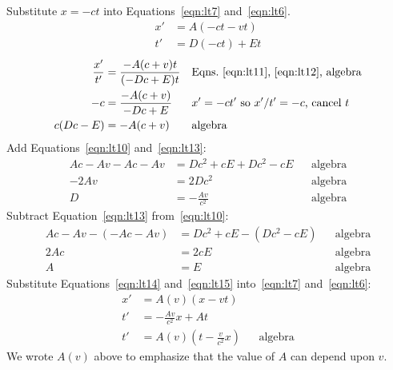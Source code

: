 \documentclass[a4paper]{article}
\theoremstyle{plain}
\theoremstyle{definition}
\begin{document}
Substitute $x = -ct$ into Equations~\eqref{eqn:lt7} and~\eqref{eqn:lt6}.
\begin{align}
x' & = A (-ct - vt) \label{eqn:lt11} \\
t' & = D(-ct) + Et \label{eqn:lt12}
\end{align}
\begin{align}
\frac{x'}{t'} & = \frac{-A (c + v)t}{(-Dc+E)t} & & \text{Eqns.~\eqref{eqn:lt11},~\eqref{eqn:lt12}, algebra} \nonumber \\
-c & = \frac{-A(c+v)}{-Dc+E} & & \text{$x'=-ct'$ so $x'/t'=-c$, cancel $t$} \nonumber \\
c(Dc-E) & = -A(c+v) & & \text{algebra} \label{eqn:lt13}
\end{align}
Add Equations~\eqref{eqn:lt10} and~\eqref{eqn:lt13}:
\begin{align}
Ac - Av - Ac - Av & = Dc^2 + cE + Dc^2 - cE & & \text{algebra} \nonumber \\
-2Av & = 2Dc^2 & & \text{algebra} \nonumber \\
D & = -\frac{Av}{c^2} & & \text{algebra} \label{eqn:lt14}
\end{align}
Subtract Equation~\eqref{eqn:lt13} from~\eqref{eqn:lt10}:
\begin{align}
Ac - Av - (-Ac - Av) & = Dc^2 + cE - (Dc^2 - cE) & & \text{algebra} \nonumber \\
2Ac & = 2cE & & \text{algebra} \nonumber \\
A & = E & & \text{algebra} \label{eqn:lt15}
\end{align}
Substitute Equations~\eqref{eqn:lt14} and~\eqref{eqn:lt15}
into~\eqref{eqn:lt7} and~\eqref{eqn:lt6}:
\begin{align}
x' & = A(v) (x - vt) \label{eqn:lt16} \\
t' & = -\frac{Av}{c^2}x + At \nonumber \\
t' & = A(v) (t -\frac{v}{c^2}x ) & & \text{algebra} \label{eqn:lt17}
\end{align}
We wrote $A(v)$ above to emphasize that the value
of $A$ can depend upon $v$.
\end{document}
